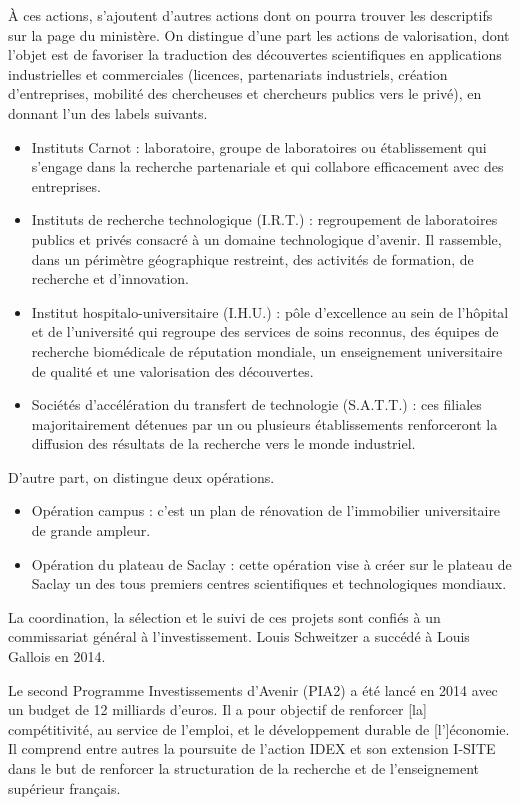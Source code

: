 \`A ces actions, s'ajoutent d'autres actions dont on pourra trouver les descriptifs sur la page du minist\`ere. 
On distingue d'une part les actions de valorisation, dont l'objet est de favoriser
la traduction des d\'ecouvertes scientifiques en applications industrielles et commerciales 
(licences, partenariats industriels, cr\'eation d'entreprises, mobilit\'e des chercheuses et chercheurs publics vers le priv\'e), 
en donnant l'un des labels suivants.
\begin{itemize}
\item Instituts Carnot : laboratoire, groupe de laboratoires ou \'etablissement qui s'engage dans la recherche partenariale 
et qui collabore efficacement avec des entreprises.
\item Instituts de recherche technologique (I.R.T.) : regroupement de laboratoires publics et priv\'es consacr\'e 
\`a un domaine technologique d'avenir. Il rassemble, dans un p\'erim\`etre g\'eographique restreint, des activit\'es de formation, 
de recherche et d'innovation.
\item Institut hospitalo-universitaire (I.H.U.) : p\^ole d'excellence au sein de l'h\^opital et de l'universit\'e 
qui regroupe des services de soins reconnus, des \'equipes de recherche biom\'edicale de r\'eputation mondiale, 
un enseignement universitaire de qualit\'e et une valorisation des d\'ecouvertes.
\item Soci\'et\'es d'acc\'el\'eration du transfert de technologie (S.A.T.T.) : 
ces filiales majoritairement d\'etenues par un ou plusieurs \'etablissements renforceront la diffusion des r\'esultats 
de la recherche vers le monde industriel.
\end{itemize}
D'autre part, on distingue deux \og op\'erations\fg{}.
\begin{itemize}
\item Op\'eration campus : c'est un plan de r\'enovation de l'immobilier universitaire de grande ampleur.
\item Op\'eration du plateau de Saclay : cette op\'eration vise \`a cr\'eer sur le plateau de Saclay 
un des tous premiers centres scientifiques et technologiques mondiaux.
\end{itemize}

La coordination, la s\'election et le suivi de ces projets sont confi\'es \`a
un commissariat g\'en\'eral \`a l'investissement. Louis Schweitzer a succ\'ed\'e \`a Louis Gallois en 2014.

Le second Programme Investissements d'Avenir (PIA2) a \'et\'e lanc\'e en 2014 avec un budget de 12 milliards
d'euros. Il a pour objectif de \og{}renforcer [la] comp\'etitivit\'e, au service de l'emploi,
et le d\'eveloppement durable de [l']\'economie.\fg{}
Il comprend entre autres la poursuite de l'action IDEX et son extension I-SITE
dans le but de renforcer la structuration de la recherche et de l'enseignement sup\'erieur fran\c cais.


